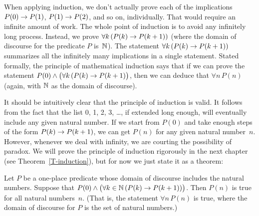 When applying induction, we don't actually prove each of the
implications $P(0)\rightarrow P(1)$, $P(1)\rightarrow P(2)$, and so on, individually.
That would require an infinite amount of work.  The whole point of
induction is to avoid any infinitely long process.  Instead, we
prove $\forall k\,(P(k)\rightarrow P(k+1))$ (where the domain of discourse for the
predicate $P$ is~${\mathbb N}$).
The statement $\forall k\,(P(k)\rightarrow P(k+1))$ summarizes all the
infinitely many implications in a single statement.  Stated formally,
the principle of
mathematical induction says that if we can prove the statement
$P(0)\wedge \big(\forall k\,(P(k)\rightarrow P(k+1)\big)$, then we 
can deduce that $\forall n\,P(n)$ (again, with ${\mathbb N}$ as the domain
of discourse).

It should be intuitively clear that the principle of induction
is valid.  It follows from the fact that the list 0, 1, 2, 3, \dots,
if extended long enough, will eventually include any given
natural number.  If we start from $P(0)$ and take enough steps
of the form $P(k)\rightarrow P(k+1)$, we can get $P(n)$ for any given natural number~$n$.
However, whenever we deal with infinity, we are courting the possibility
of paradox.  We will prove the principle of induction rigorously
in the next chapter (see Theorem~\ref{T-induction}), but for now
we just state it as a theorem:

\begin{theorem}
Let $P$ be a one-place predicate whose domain of discourse includes
the natural numbers.  Suppose that $P(0)\wedge \big(\forall k\in{\mathbb N}\,(P(k)\rightarrow P(k+1))\big)$.
Then $P(n)$ is true for all natural numbers~$n$.  (That is, 
the statement $\forall n\,P(n)$ is true, where the domain of discourse for $P$ is
the set of natural numbers.)
\end{theorem}

